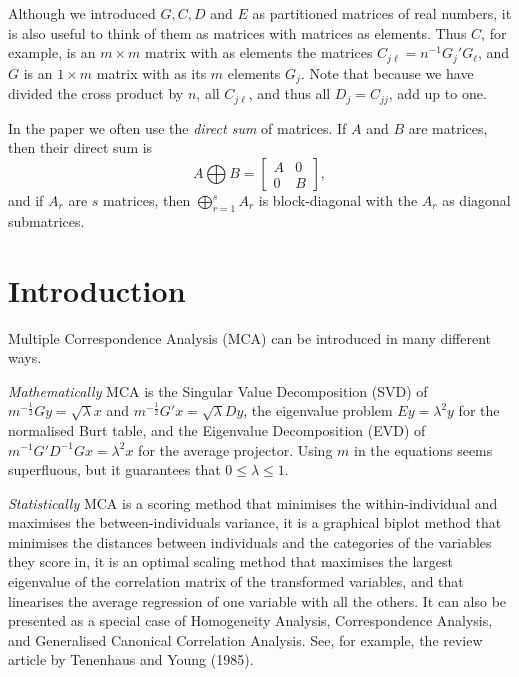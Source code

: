 \documentclass[
  12pt,
]{article}
\begin{document}
Although we introduced \(G, C, D\) and \(E\) as partitioned matrices of real
numbers, it is also useful to think of them as matrices with matrices
as elements. Thus \(C\), for example, is an \(m\times m\) matrix with as elements
the matrices \(C_{j\ell}^{\ }=n^{-1}G_j'G_\ell^{\ }\), and \(G\) is an \(1\times m\)
matrix with as its \(m\) elements \(G_j\). Note that because we have divided
the cross product by \(n\), all \(C_{j\ell}\), and thus all \(D_j=C_{jj}\), add up to one.

In the paper we often use the \emph{direct sum} of matrices. If \(A\) and \(B\) are matrices, then their direct sum is
\begin{equation}
A\bigoplus B=\begin{bmatrix}A&0\\0&B\end{bmatrix},
\label{eq:oplus}
\end{equation}
and if \(A_r\) are \(s\) matrices, then \(\bigoplus_{r=1}^s A_r\) is block-diagonal
with the \(A_r\) as diagonal submatrices.

\section{Introduction}\label{introduction}

Multiple Correspondence Analysis (MCA) can be introduced in many different ways.

\emph{Mathematically} MCA is the Singular Value Decomposition (SVD) of \(m^{-\frac12}Gy=\sqrt{\lambda}x\) and \(m^{-\frac12}G'x=\sqrt{\lambda}Dy\), the eigenvalue problem \(Ey=\lambda^2 y\) for the normalised Burt table, and the Eigenvalue Decomposition (EVD) of \(m^{-1}G'D^{-1}Gx=\lambda^2 x\) for the average projector. Using \(m\) in the equations seems superfluous, but it guarantees that \(0\leq\lambda\leq 1\).

\emph{Statistically} MCA is a scoring method that minimises the within-individual and maximises the between-individuals variance, it is a graphical biplot method that minimises the distances between individuals and the categories of the variables they score in, it is an optimal scaling method that maximises the largest eigenvalue of the correlation matrix of the transformed variables, and that linearises the average regression of one variable with all the others. It can also be presented as a special case of Homogeneity Analysis, Correspondence Analysis, and Generalised Canonical Correlation Analysis. See, for example, the review article by Tenenhaus and Young (1985).
\end{document}
